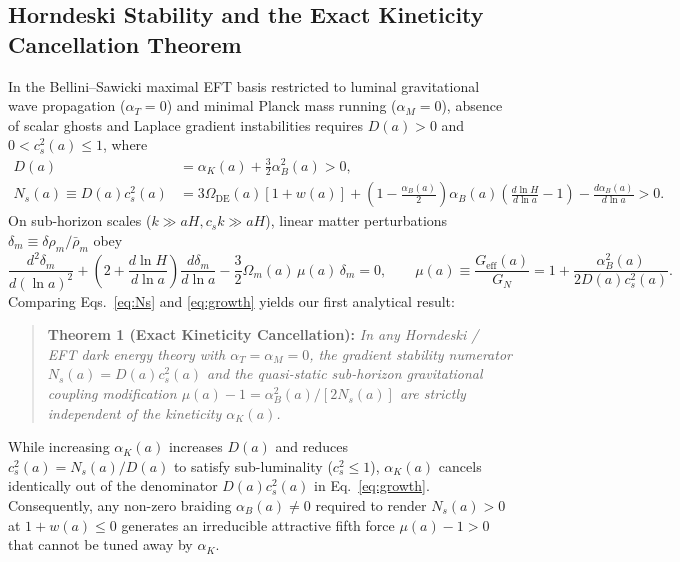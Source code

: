 \documentclass[11pt,a4paper]{article}
\begin{document}
\subsection{Horndeski Stability and the Exact Kineticity Cancellation Theorem}
In the Bellini--Sawicki maximal EFT basis \cite{Bellini:2014maximal} restricted to luminal gravitational wave propagation ($\alpha_T = 0$) and minimal Planck mass running ($\alpha_M = 0$), absence of scalar ghosts and Laplace gradient instabilities requires $D(a) > 0$ and $0 < c_s^2(a) \le 1$, where
\begin{align}
    D(a) &= \alpha_K(a) + \frac{3}{2}\alpha_B^2(a) > 0, \label{eq:noghost} \\
    N_s(a) \equiv D(a)c_s^2(a) &= 3\Omega_{\mathrm{DE}}(a)[1 + w(a)] + \left(1 - \frac{\alpha_B(a)}{2}\right)\alpha_B(a)\left(\frac{d\ln H}{d\ln a} - 1\right) - \frac{d\alpha_B(a)}{d\ln a} > 0. \label{eq:Ns}
\end{align}
On sub-horizon scales ($k \gg aH, c_s k \gg aH$), linear matter perturbations $\delta_m \equiv \delta\rho_m / \bar{\rho}_m$ obey
\begin{equation}
    \frac{d^2\delta_m}{d(\ln a)^2} + \left(2 + \frac{d\ln H}{d\ln a}\right)\frac{d\delta_m}{d\ln a} - \frac{3}{2}\Omega_m(a)\,\mu(a)\,\delta_m = 0, \qquad \mu(a) \equiv \frac{G_{\mathrm{eff}}(a)}{G_N} = 1 + \frac{\alpha_B^2(a)}{2 D(a) c_s^2(a)}. \label{eq:growth}
\end{equation}
Comparing Eqs.~\eqref{eq:Ns} and \eqref{eq:growth} yields our first analytical result:
\begin{quote}
\textbf{Theorem 1 (Exact Kineticity Cancellation):} \textit{In any Horndeski / EFT dark energy theory with $\alpha_T = \alpha_M = 0$, the gradient stability numerator $N_s(a) = D(a)c_s^2(a)$ and the quasi-static sub-horizon gravitational coupling modification $\mu(a) - 1 = \alpha_B^2(a) / [2 N_s(a)]$ are strictly independent of the kineticity $\alpha_K(a)$.}
\end{quote}
While increasing $\alpha_K(a)$ increases $D(a)$ and reduces $c_s^2(a) = N_s(a)/D(a)$ to satisfy sub-luminality ($c_s^2 \le 1$), $\alpha_K(a)$ cancels identically out of the denominator $D(a)c_s^2(a)$ in Eq.~\eqref{eq:growth}. Consequently, any non-zero braiding $\alpha_B(a) \neq 0$ required to render $N_s(a) > 0$ at $1 + w(a) \le 0$ generates an irreducible attractive fifth force $\mu(a) - 1 > 0$ that cannot be tuned away by $\alpha_K$.
\end{document}
